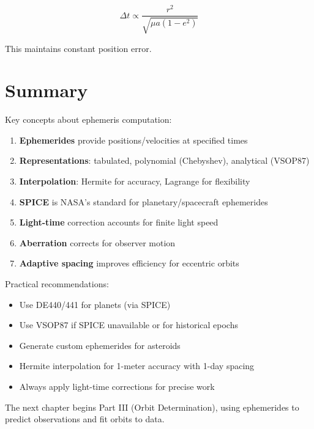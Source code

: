 \begin{equation}
    \Delta t \propto \frac{r^2}{\sqrt{\mu a(1-e^2)}}
\end{equation}

This maintains constant position error.

\section{Summary}

Key concepts about ephemeris computation:

\begin{enumerate}
    \item \textbf{Ephemerides} provide positions/velocities at specified times
    \item \textbf{Representations}: tabulated, polynomial (Chebyshev), analytical (VSOP87)
    \item \textbf{Interpolation}: Hermite for accuracy, Lagrange for flexibility
    \item \textbf{SPICE} is NASA's standard for planetary/spacecraft ephemerides
    \item \textbf{Light-time} correction accounts for finite light speed
    \item \textbf{Aberration} corrects for observer motion
    \item \textbf{Adaptive spacing} improves efficiency for eccentric orbits
\end{enumerate}

Practical recommendations:
\begin{itemize}
    \item Use DE440/441 for planets (via SPICE)
    \item Use VSOP87 if SPICE unavailable or for historical epochs
    \item Generate custom ephemerides for asteroids
    \item Hermite interpolation for 1-meter accuracy with 1-day spacing
    \item Always apply light-time corrections for precise work
\end{itemize}

The next chapter begins Part III (Orbit Determination), using ephemerides to predict observations and fit orbits to data.

